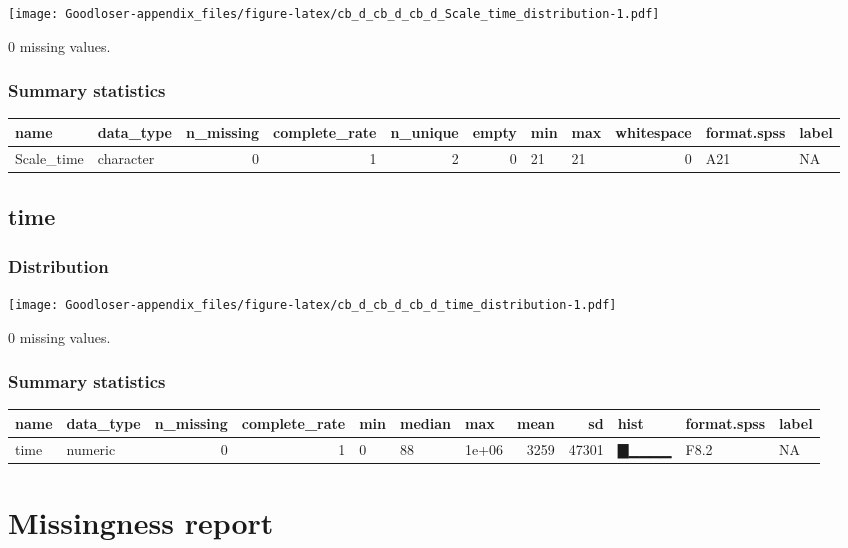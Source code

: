 \documentclass[
]{book}
\begin{document}
\texttt{[image: Goodloser-appendix\_files/figure-latex/cb\_d\_cb\_d\_cb\_d\_Scale\_time\_distribution-1.pdf]}

0 missing values.

\hypertarget{Scale_time_summary}{%
\subsubsection{Summary statistics}\label{Scale_time_summary}}

\begin{tabular}{l|l|r|r|r|r|l|l|r|l|l}
\hline
name & data_type & n_missing & complete_rate & n_unique & empty & min & max & whitespace & format.spss & label\\
\hline
Scale_time & character & 0 & 1 & 2 & 0 & 21 & 21 & 0 & A21 & NA\\
\hline
\end{tabular}

\hypertarget{time}{%
\subsection{time}\label{time}}

\hypertarget{time_distribution}{%
\subsubsection{Distribution}\label{time_distribution}}

\texttt{[image: Goodloser-appendix\_files/figure-latex/cb\_d\_cb\_d\_cb\_d\_time\_distribution-1.pdf]}

0 missing values.

\hypertarget{time_summary}{%
\subsubsection{Summary statistics}\label{time_summary}}

\begin{tabular}{l|l|r|r|l|l|l|r|r|l|l|l}
\hline
name & data_type & n_missing & complete_rate & min & median & max & mean & sd & hist & format.spss & label\\
\hline
time & numeric & 0 & 1 & 0 & 88 & 1e+06 & 3259 & 47301 & ▇▁▁▁▁ & F8.2 & NA\\
\hline
\end{tabular}

\hypertarget{missingness-report-2}{%
\section{Missingness report}\label{missingness-report-2}}
\end{document}
